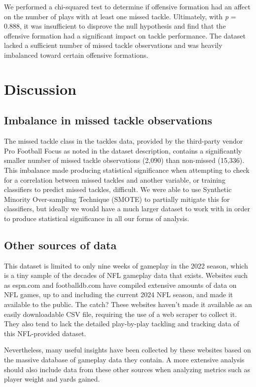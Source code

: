 \documentclass[bibtex, sigconf, hyperref={colorlinks=true,linkcolor=blue,urlcolor=blue}]{acmart}
\begin{document}
We performed a chi-squared test to determine if offensive formation had an
affect on the number of plays with at least one missed tackle. Ultimately, with
\textit{p} = 0.888, it was insufficient to disprove the null hypothesis and find
that the offensive formation had a significant impact on tackle performance. The
dataset lacked a sufficient number of missed tackle observations and was heavily
imbalanced toward certain offensive formations.

\section{Discussion}

\subsection{Imbalance in missed tackle observations}

The missed tackle class in the tackles data, provided by the third-party vendor
Pro Football Focus as noted in the dataset description, contains a significantly
smaller number of missed tackle observations (2,090) than non-missed (15,336).
This imbalance made producing statistical significance when attempting to check
for a correlation between missed tackles and another variable, or training
classifiers to predict missed tackles, difficult. We were able to use Synthetic
Minority Over-sampling Technique (SMOTE) to partially mitigate this for
classifiers, but ideally we would have a much larger dataset to work with in
order to produce statistical significance in all our forms of analysis.

\subsection{Other sources of data}

This dataset is limited to only nine weeks of gameplay in the 2022 season, which
is a tiny sample of the decades of NFL gameplay data that exists. Websites such
as espn.com and footballdb.com have compiled extensive amounts of data on NFL
games, up to and including the current 2024 NFL season, and made it available to
the public. The catch? These websites haven't made it available as an easily
downloadable CSV file, requiring the use of a web scraper to collect it. They
also tend to lack the detailed play-by-play tackling and tracking data of this
NFL-provided dataset.

Nevertheless, many useful insights have been collected by these websites based
on the massive database of gameplay data they contain. A more extensive analysis
should also include data from these other sources when analyzing metrics such as
player weight and yards gained.
\end{document}
